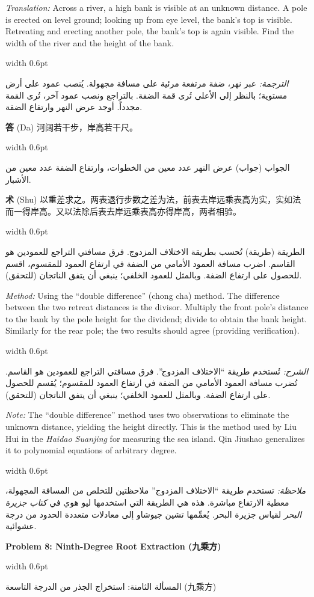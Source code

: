 \documentclass[11pt,a4paper]{article}
\newlength{\cnwidth}
\newlength{\arwidth}
\newcommand{\paralleltext}[2]{%
  \par\medskip\noindent
  \begin{minipage}[t]{\cnwidth}%
    \small #1%
  \end{minipage}%
  \hfill\textcolor{colrule}{\vrule width 0.6pt}\hfill
  \begin{minipage}[t]{\arwidth}%
    \small\arabicfont\beginR #2\endR%
  \end{minipage}%
  \par\medskip
}
\newcommand{\parallelsubsection}[2]{%
  \par\medskip\noindent
  \begin{minipage}[t]{\cnwidth}%
    \large\bfseries\color{sectioncolor} #1%
  \end{minipage}%
  \hfill\textcolor{colrule}{\vrule width 0.6pt}\hfill
  \begin{minipage}[t]{\arwidth}%
    \large\arabicfontbf\color{sectioncolor}\beginR #2\endR%
  \end{minipage}%
  \par\smallskip
}
\newcommand{\cnlabel}[1]{\textbf{\color{notecolor}#1}}
\newcommand{\arlabel}[1]{\arabicfontbf\color{notecolor}\beginR #1\endR}
\begin{document}
\paralleltext{%
\textit{Translation:} Across a river, a high bank is visible at an unknown distance. A pole is erected on level ground; looking up from eye level, the bank's top is visible. Retreating and erecting another pole, the bank's top is again visible. Find the width of the river and the height of the bank.
}{%
\textit{الترجمة:} عبر نهر، ضفة مرتفعة مرئية على مسافة مجهولة. يُنصب عمود على أرض مستوية؛ بالنظر إلى الأعلى تُرى قمة الضفة. بالتراجع ونصب عمود آخر، تُرى القمة مجدداً. أوجد عرض النهر وارتفاع الضفة.
}

\paralleltext{%
\cnlabel{答} (Da) 河阔若干步，岸高若干尺。
}{%
\arlabel{الجواب} (جواب) عرض النهر عدد معين من الخطوات، وارتفاع الضفة عدد معين من الأشبار.
}

\paralleltext{%
\cnlabel{术} (Shu) 以重差求之。两表退行步数之差为法，前表去岸远乘表高为实，实如法而一得岸高。又以法除后表去岸远乘表高亦得岸高，两者相验。
}{%
\arlabel{الطريقة} (طريقة) تُحسب بطريقة الاختلاف المزدوج. فرق مسافتي التراجع للعمودين هو القاسم. اضرب مسافة العمود الأمامي من الضفة في ارتفاع العمود للمقسوم، اقسم للحصول على ارتفاع الضفة. وبالمثل للعمود الخلفي؛ ينبغي أن يتفق الناتجان (للتحقق).
}

\paralleltext{%
\textit{Method:} Using the ``double difference'' (chong cha) method. The difference between the two retreat distances is the divisor. Multiply the front pole's distance to the bank by the pole height for the dividend; divide to obtain the bank height. Similarly for the rear pole; the two results should agree (providing verification).
}{%
\textit{الشرح:} تُستخدم طريقة ``الاختلاف المزدوج''. فرق مسافتي التراجع للعمودين هو القاسم. تُضرب مسافة العمود الأمامي من الضفة في ارتفاع العمود للمقسوم؛ يُقسم للحصول على ارتفاع الضفة. وبالمثل للعمود الخلفي؛ ينبغي أن يتفق الناتجان (للتحقق).
}

\paralleltext{%
\textit{Note:} The ``double difference'' method uses two observations to eliminate the unknown distance, yielding the height directly. This is the method used by Liu Hui in the \textit{Haidao Suanjing} for measuring the sea island. Qin Jiushao generalizes it to polynomial equations of arbitrary degree.
}{%
\textit{ملاحظة:} تستخدم طريقة ``الاختلاف المزدوج'' ملاحظتين للتخلص من المسافة المجهولة، معطية الارتفاع مباشرة. هذه هي الطريقة التي استخدمها ليو هوي في \textit{كتاب جزيرة البحر} لقياس جزيرة البحر. يُعمِّمها تشين جيوشاو إلى معادلات متعددة الحدود من درجة عشوائية.
}

\parallelsubsection{Problem 8: Ninth-Degree Root Extraction (九乘方)}{المسألة الثامنة: استخراج الجذر من الدرجة التاسعة (九乘方)}
\end{document}
